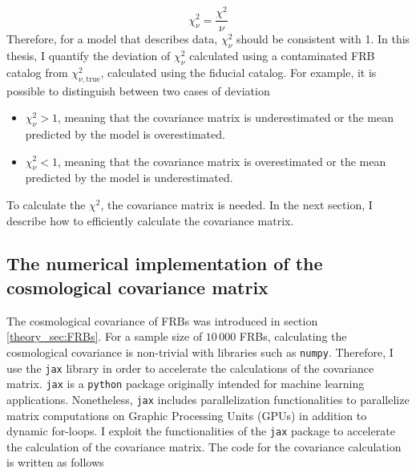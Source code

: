 \begin{equation}
    \chi^2_\nu = \frac{\chi^2}{\nu}
\end{equation}
Therefore, for a model that describes data, $\chi^2_\nu$ should be consistent with 1. In this thesis, I quantify the deviation of $\chi^2_\nu$ calculated using a contaminated FRB catalog from $\chi^2_{\nu, \mathrm{true}}$, calculated using the fiducial catalog. For example, it is possible to distinguish between two cases of deviation
\begin{itemize}
    \item $\chi^2_\nu > 1$, meaning that the covariance matrix is underestimated or the mean predicted by the model is overestimated.
    \item $\chi^2_\nu < 1$, meaning that the covariance matrix is overestimated or the mean predicted by the model is underestimated.
\end{itemize}


To calculate the $\chi^2$, the covariance matrix is needed. In the next section, I describe how to efficiently calculate the covariance matrix.
\subsection{The numerical implementation of the cosmological covariance matrix}
The cosmological covariance of FRBs was introduced in section \ref{theory_sec:FRBs}. For a sample size of $10\,000$ FRBs, calculating the cosmological covariance is non-trivial with libraries such as \texttt{numpy}. Therefore, I use the \texttt{jax} library in order to accelerate the calculations of the covariance matrix. \texttt{jax} is a \texttt{python} package originally intended for machine learning applications. Nonetheless, \texttt{jax} includes parallelization functionalities to parallelize matrix computations on Graphic Processing Units (GPUs) in addition to dynamic for-loops. I exploit the functionalities of the \texttt{jax} package to accelerate the calculation of the covariance matrix. The code for the covariance calculation is written as follows

